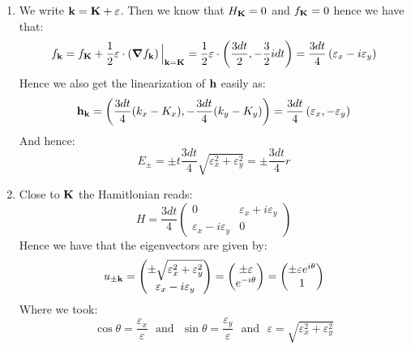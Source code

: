\documentclass[10pt,a4paper]{article}
\begin{document}
\begin{enumerate}
\item We write $\vb{k} = \vb{K} + \vb{\varepsilon}$. Then we know that $H_{\vb{K}} = 0$ and $f_{\vb{K}} = 0$ hence we have that:
\[
f_{\vb{k}} = f_{\vb{K}}  + \frac{1}{2}\vb{\varepsilon} \cdot \left(\grad f_{\vb{k}} \right) \Big|_{\vb{k} = \vb{K}} = \frac{1}{2} \vb{\varepsilon} \cdot \left( \frac{3 d t}{2}, - \frac{3}{2} i d t  \right) = \frac{3dt}{4}\left( \varepsilon_x - i \varepsilon_y \right)
\] 
Hence we also get the linearization of $\vb{h}$ easily as:
\[
\vb{h}_{\vb{k}} = \left(\frac{3dt}{4} (k_x - K_x), -\frac{3 dt}{4} (k_y - K_y)\right)  = \frac{3 dt}{4}\left(\varepsilon_x, - \varepsilon_y \right)
\]
And hence:
\[
E_\pm = \pm t \frac{3 dt}{4} \sqrt{\varepsilon_x^2 + \varepsilon_y^2} = \pm \frac{3 d t}{4} r 
\]

\item Close to $\vb{K}$ the Hamitlonian reads:
\[
H = \frac{3 d t}{4}\begin{pmatrix}
0 & \varepsilon_x + i \varepsilon_y\\
\varepsilon_x - i \varepsilon_y & 0 
\end{pmatrix}
\]
Hence we have that the eigenvectors are given by:
\[
u_{\pm \vb{k}} = \begin{pmatrix}
\pm \sqrt{\varepsilon_x^2 + \varepsilon_y^2}\\
\varepsilon_x - i \varepsilon_y
\end{pmatrix} = \begin{pmatrix}
\pm \varepsilon\\
e^{-i \theta}
\end{pmatrix} = \begin{pmatrix}
\pm \varepsilon e^{i \theta}\\
1 
\end{pmatrix}
\]
Where we took:
\[
\cos \theta = \frac{\varepsilon_x}{\varepsilon} \mbox{~~and~~} \sin \theta = \frac{\varepsilon_y}{\varepsilon} \mbox{~~and~~} \varepsilon = \sqrt{\varepsilon_x^2 + \varepsilon_y^2}
\]


\end{enumerate}
\end{document}
